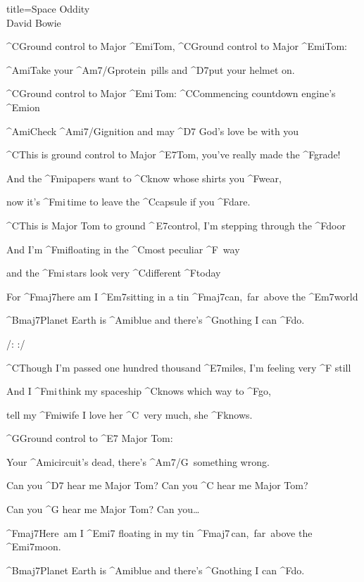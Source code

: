 \begin{song}{title=\predtitle\centering Space Oddity \\\large David Bowie  \vspace*{-0.3cm}}  %

\nejvetsi
\begin{centerjustified}

\sloka 
	^{C\z}Ground control to Major ^{Emi\z}Tom, ^{C\z}Ground control to Major ^{Emi\z}Tom:

	^{Ami}Take your ^{Am7/G\z}protein~pills and ^{D7}put your helmet on.

	^{C\z}Ground control to Major ^{Emi\,}Tom:  ^{C\z}Commencing countdown engine's ^{Emi\z}on~~

	^{Ami\z}Check ^{Ami7/G}ignition and may ^{D7\,\,}God's love be with you

	^{C\z }This is ground control to Major ^{E7}Tom, you've really made the ^{F\z}grade!

	And the ^{Fmi\z }papers want to ^{C\z }know whose shirts you ^{F\z}wear,

	now it's ^{Fmi\,}time to leave the ^{C{\z}}capsule if you ^{F{\z}}dare.

	^{C{\z}}This is Major Tom to ground ^{\,E7}control, I'm stepping through the ^{F{\z}}door

	And I'm ^{Fmi{\z}}floating in the ^{C\z}most peculiar ^{F\,\,\,}way 

	and the ^{Fmi\,}stars look very ^{C\z}different ^{F}today

	For ^{Fmaj7}here am I ^{Em7}sitting in a tin ^{Fmaj7\:}can,~far~above the ^{Em7}world

	^{Bmaj7}Planet Earth is ^{Ami}blue and there's ^{G{\z}}nothing I can ^{F}do.

	\phantom{.}

	\phantom{.}

/:  :/ 

\end{centerjustified}
\newpage
\begin{centerjustified}

\sloka
	^{C{\z}}Though I'm passed one hundred thousand ^{E7{\z}}miles, I'm feeling very ^{F\,\,}still

	And I ^{Fmi\,}think my spaceship ^{C{\z}}knows which way to ^{F}go,

	tell my ^{Fmi}wife I love her ^{C\,\,\,}very much, she ^{F{\z}}knows.

	^{G\z}Ground control to ^{E7\,\,}Major Tom:

	Your ^{Ami{\z}}circuit's dead, there's ^{Am7/G\,\,\,}something wrong.

	Can you ^{D7\,\,}hear me Major Tom? Can you ^{C\,\,}hear me Major Tom? 

	Can you ^{G\,\,}hear me Major Tom? Can you\dots

	^{Fmaj7\z}Here~am I ^{Emi7\,\,}floating in my tin ^{Fmaj7\,}can,~far~above the ^{Emi7}moon.

	^{Bmaj7}Planet Earth is ^{Ami}blue and there's ^{G\z}nothing I can ^{F}do.


\end{centerjustified}
\setcounter{Slokočet}{0}
\end{song}
